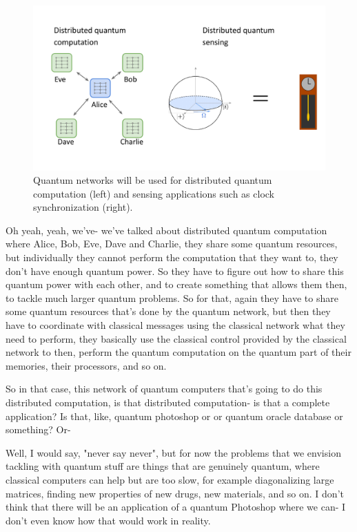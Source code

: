 \begin{figure}[t]
    \centering
    \includegraphics[width=1\textwidth]{lesson15/R2L15fig5.pdf}
    \caption[Uses of quantum networking]{Quantum networks will be used for distributed quantum computation (left) and sensing applications such as clock synchronization (right).}
    \label{fig:15-5-apps}
\end{figure}


\mmm Oh yeah, yeah, we've- we've talked about distributed quantum computation where Alice, Bob, Eve, Dave and Charlie, they share some quantum resources, but individually they cannot perform the computation that they want to, they don't have enough quantum power. So they have to figure out how to share this quantum power with each other, and to create something that allows them then, to tackle much larger quantum problems. So for that, again they have to share some quantum resources that's done by the quantum network, but then they have to coordinate with classical messages using the classical network what they need to perform, they basically use the classical control provided by the classical network to then, perform the quantum computation on the quantum part of their memories, their processors, and so on.

\rrr So in that case, this network of quantum computers that's going to do this distributed computation, is that distributed computation- is that a complete application? Is that, like, quantum photoshop or or quantum oracle database or something? Or-

\mmm Well, I would say, "never say never", but for now the problems that we envision tackling with quantum stuff are things that are genuinely quantum, where classical computers can help but are too slow, for example diagonalizing large matrices, finding new properties of new drugs, new materials, and so on. I don't think that there will be an application of a quantum Photoshop where we can- I don't even know how that would work in reality.

